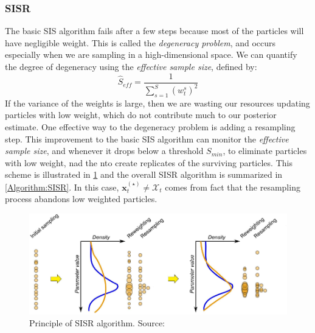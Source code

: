 \subsubsection{\acrfull{SISR}}
The basic \acrshort{SIS} algorithm fails after a few steps because most of the particles will have negligible weight. This is called the \textit{degeneracy problem}, and occurs especially when we are sampling in a high-dimensional space. We can quantify the degree of degeneracy using the \textit{effective sample size}, defined by:
\begin{equation}
    \label{eq: SISR_Seff}
\hat{S}_{eff}=
\frac{1}{\sum_{s=1}^{S} 
(w_{t}^{s})^2
} 
\end{equation}
If the variance of the weights is large, then we are wasting our resources updating particles with low weight, which do not contribute much to our posterior estimate. One effective way to the degeneracy problem is adding a resampling step. This improvement to the basic \acrshort{SIS} algorithm can monitor the \textit{effective sample size}, and whenever it drops below a threshold $S_{min}$, to eliminate particles with low weight, nad the nto create replicates of the surviving particles. This scheme is illustrated in \cref{fig: PF-SISR} and the overall \acrshort{SISR} algorithm is summarized in \ref{Algorithm:SISR}. In this case, $\boldsymbol{x}_{t}^{(\star)} \neq \mathcal{X}_{t}$ comes from fact that the resampling process abandons low weighted particles.


\begin{figure}[htbp]
    \centering
    \includegraphics[width = 140mm]{Figures/figure-PF-SISR.pdf}
    \caption{Principle of \acrshort{SISR} algorithm. Source: \protect\cite{speich2021}}
    \label{fig: PF-SISR}
\end{figure}

